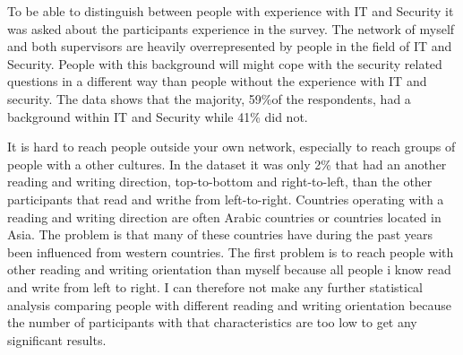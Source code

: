   To be able to distinguish between people with experience with IT and Security it was asked about the participants experience in the survey. The network of myself and both supervisors are heavily overrepresented by people in the field of IT and Security. People with this background will might cope with the security related questions in a different way than people without the experience with IT and security. The data shows that the majority, 59\%of the respondents, had a background within IT and Security while 41\% did not. 

  It is hard to reach people outside your own network, especially to reach groups of people with a other cultures. In the dataset it was only 2\% that had an another reading and writing direction, top-to-bottom and right-to-left, than the other participants that read and writhe from left-to-right. Countries operating with a reading and writing direction are often Arabic countries or countries located in Asia. The problem is that many of these countries have during the past years been influenced from western countries. The first problem is to reach people with other reading and writing orientation than myself because all people i know read and write from left to right. I can therefore not make any further statistical analysis comparing people with different reading and writing orientation because the number of participants with that characteristics are too low to get any significant results.

    \begin{figure}[H]
      \centering
      \hspace{0.5cm}
    \end{figure}
    
